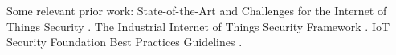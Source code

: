 Some relevant prior work: 
State-of-the-Art and Challenges for the Internet of Things Security \cite{Garcia2017a}.
The Industrial Internet of Things Security Framework \cite{Iic2016sf}.
IoT Security Foundation Best Practices Guidelines \cite{Iotsf2017a}.
